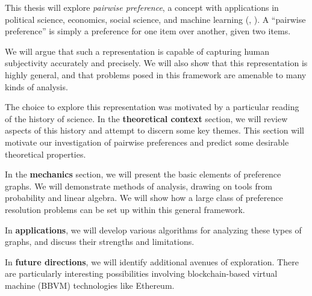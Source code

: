 This thesis will explore \textit{pairwise preference}, a concept with applications in political science, economics, social science, and machine learning (\cite{jordan}, \cite{arrow}).
A ``pairwise preference'' is simply a preference for one item over another, given two items.

We will argue that such a representation is capable of capturing human subjectivity accurately and precisely.
We will also show that this representation is highly general, and that problems posed in this framework are amenable to many kinds of analysis.

\bigskip

The choice to explore this representation was motivated by a particular reading of the history of science.
In the \textbf{theoretical context} section, we will review aspects of this history and attempt to discern some key themes.
This section will motivate our investigation of pairwise preferences and predict some desirable theoretical properties.

In the \textbf{mechanics} section, we will present the basic elements of preference graphs.
We will demonstrate methods of analysis, drawing on tools from probability and linear algebra.
We will show how a large class of preference resolution problems can be set up within this general framework.

In \textbf{applications}, we will develop various algorithms for analyzing these types of graphs, and discuss their strengths and limitations.

In \textbf{future directions}, we will identify additional avenues of exploration. There are particularly interesting possibilities involving blockchain-based virtual machine (BBVM) technologies like Ethereum.
